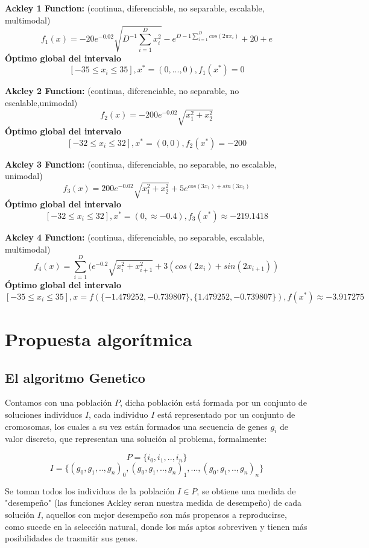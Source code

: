 \documentclass[10pt]{article}
\begin{document}
\textbf{Ackley 1 Function: } (continua, diferenciable, no separable, escalable, multimodal)
 $$ f_1(x) = -20e^{-0.02}\sqrt{D^{-1}\sum_{i=1}^{D}x_{i}^2}-e^{D-1\sum_{i=1}^{D}cos(2\pi x_i)}+20+e$$
\textbf{Óptimo global del intervalo} 
$$[-35\leq x_i \leq 35], x^* = (0,..., 0), f_1(x^*) = 0$$

\textbf{Akcley 2  Function:  } (continua, diferenciable, no separable, no escalable,unimodal)
$$ f_2(x) = -200e^{-0.02}\sqrt{x_1^2+x_2^2}$$
\textbf{Óptimo global del intervalo}
 $$[-32\leq x_i \leq 32], x^* = (0,0), f_2(x^*) = -200$$

\textbf{Akcley 3  Function:  } (continua, diferenciable, no separable, no escalable, unimodal)
$$ f_3(x) = 200e^{-0.02}\sqrt{x_1^2+x_2^2}+5e^{cos(3x_1)+sin(3x_2)}$$
\textbf{Óptimo global del intervalo} 
$$[-32\leq x_i \leq 32], x^* = (0, \approx -0.4), f_3(x^*) \approx -219.1418$$

\textbf{Akcley 4  Function: } (continua, diferenciable, no separable, escalable, multimodal)
$$f_4(x) =  \sum_{i=1}^{D}(e^{-0.2}\sqrt{x_i^2+x_{i+1}^2}+3(cos(2x_i)+sin(2x_{i+1}))$$
\textbf{Óptimo global del intervalo} 
$$[-35\leq x_i \leq 35], x=f(\{-1.479252,-0.739807\},\{1.479252,-0.739807\}), f(x^*) \approx -3.917275$$ 

\section{Propuesta algorítmica} %

\subsection{El algoritmo Genetico}

Contamos con una población $P$, dicha población está formada por un conjunto de soluciones individuos $I$, cada individuo $I$ está representado por un conjunto de cromosomas, los cuales a su vez están formados una secuencia de genes $g_i$ de valor discreto, que representan una solución al problema, formalmente:

$$P =\{i_0,i_1,..,i_n\}$$
$$I =\{(g_0,g_1,..,g_n)_0,(g_0,g_1,..,g_n)_1,...,(g_0,g_1,..,g_n)_n\}$$

Se toman todos los individuos de la población $I \in P$, se obtiene una medida de "desempeño" (las funciones Ackley seran nuestra medida de desempeño) de cada solución $I$, aquellos con mejor desempeño son más propensos a reproducirse, como sucede en la selección natural, donde los más aptos sobreviven y tienen más posibilidades de trasmitir sus genes.
\end{document}
